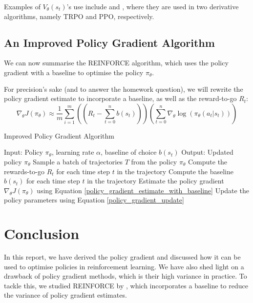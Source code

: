 \documentclass{article} %
\begin{document}
Examples of $V_\theta(s_t)$'s use include \cite{Schulman-et-al-2015} and \cite{Schulman-et-al-2017}, where they are used in two derivative algorithms, namely TRPO and PPO, respectively.

\subsection{An Improved Policy Gradient Algorithm}
We can now summarise the REINFORCE algorithm, which uses the policy gradient with a baseline to optimise the policy $\pi_\theta$.

For precision's sake (and to answer the homework question), we will rewrite the policy gradient estimate to incorporate a baseline, as well as the reward-to-go $R_t$:
\begin{equation} \label{policy_gradient_estimate_with_baseline}
    \nabla_\theta J(\pi_\theta) \approx \frac{1}{m} \sum_{i=1}^{m} \left((R_t - \sum_{t=0}^{n} b(s_t))\right) \left( \sum_{t=0}^{n} \nabla_\theta \log(\pi_\theta(a_t | s_t)) \right)
\end{equation}

\begin{algorithm}[H]
    \caption{Improved Policy Gradient Algorithm}
    \label{alg:reinforce}
    \begin{algorithmic}[1]
        \State Input: Policy $\pi_\theta$, learning rate $\alpha$, baseline of choice $b(s_t)$
        \State Output: Updated policy $\pi_\theta$
            \State Sample a batch of trajectories $T$ from the policy $\pi_\theta$
                \State Compute the rewards-to-go $R_t$ for each time step $t$ in the trajectory
                \State Compute the baseline $b(s_t)$ for each time step $t$ in the trajectory
                \State Estimate the policy gradient $\nabla_\theta J(\pi_\theta)$ using Equation \eqref{policy_gradient_estimate_with_baseline}
            \EndFor
            \State Update the policy parameters using Equation \eqref{policy_gradient_update}
        \EndWhile
    \end{algorithmic}
\end{algorithm}

\section{Conclusion}
In this report, we have derived the policy gradient and discussed how it can be used to optimise policies in reinforcement learning.
We have also shed light on a drawback of policy gradient methods, which is their high variance in practice.
To tackle this, we studied REINFORCE by \cite{Williams-1992}, which incorporates a baseline to reduce the variance of policy gradient estimates.
\end{document}
